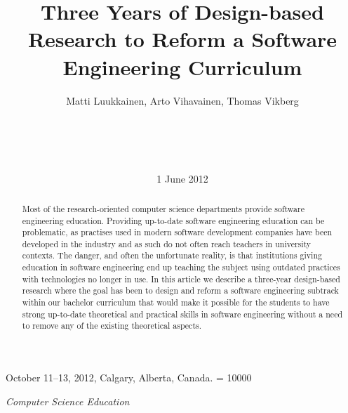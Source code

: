 \documentclass{sig-alternate}
\begin{document}
\setlength{\pdfpagewidth}{8.5in}
\setlength{\pdfpageheight}{11in}

 {October 11--13, 2012, Calgary, Alberta, Canada.}
\widowpenalty = 10000


\title{Three Years of Design-based Research to Reform a Software Engineering Curriculum}
\author{
\alignauthor
Matti Luukkainen, Arto Vihavainen, Thomas Vikberg\\
 \\
 \\
 \\
 \\
}

\date{1 June 2012}
\maketitle

\begin{abstract}
Most of the research-oriented computer science departments provide software engineering education. Providing up-to-date software engineering education can be problematic, as practises used in modern software development companies have been developed in the industry and as such do not often reach teachers in university contexts. The danger, and often the unfortunate reality, is that institutions giving education in software engineering end up teaching the subject using outdated practices with technologies no longer in use. In this article we describe a three-year design-based research where the goal has been to design and reform a software engineering subtrack within our bachelor curriculum that would make it possible for the students to have strong up-to-date theoretical and practical skills in software engineering without a need to remove any of the existing theoretical aspects.
\end{abstract}
 
{ {\em Computer Science Education}}
\end{document}
